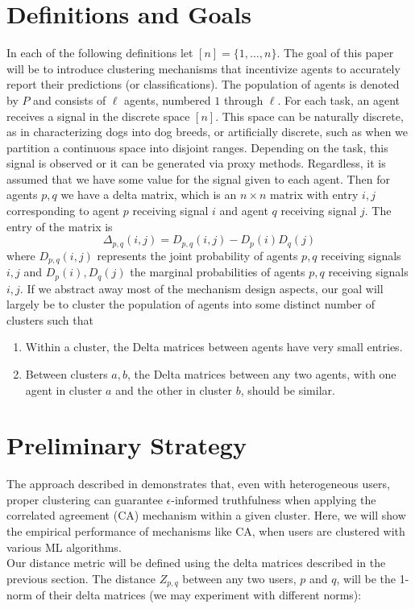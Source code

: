 \documentclass[a4paper, 12pt]{article}
\begin{document}
\section{Definitions and Goals}
In each of the following definitions let $[n] = \{1, \dots, n\}$. The goal of this paper will be to introduce clustering mechanisms that incentivize agents to accurately report their predictions (or classifications). The population of agents is denoted by $P$ and consists of $\ell$ agents, numbered $1$ through $\ell$. For each task, an agent receives a signal in the discrete space $[n]$. This space can be naturally discrete, as in characterizing dogs into dog breeds, or artificially discrete, such as when we partition a continuous space into disjoint ranges. Depending on the task, this signal is observed or it can be generated via proxy methods. Regardless, it is assumed that we have some value for the signal given to each agent. Then for agents $p,q$ we have a delta matrix, which is an $n \times n$ matrix with entry $i,j$ corresponding to agent $p$ receiving signal $i$ and agent $q$ receiving signal $j$. The entry of the matrix is $$\Delta_{p,q}(i,j) = D_{p,q}(i,j) - D_{p}(i)D_{q}(j)$$ where $D_{p,q}(i,j)$ represents the joint probability of agents $p,q$ receiving signals $i,j$ and $D_{p}(i),D_{q}(j)$ the marginal probabilities of agents $p,q$ receiving signals $i,j$. If we abstract away most of the mechanism design aspects, our goal will largely be to cluster the population of agents into some distinct number of clusters such that \begin{enumerate}
\item Within a cluster, the Delta matrices between agents have very small entries.
\item Between clusters $a,b$, the Delta matrices between any two agents, with one agent in cluster $a$ and the other in cluster $b$, should be similar.
\end{enumerate}

% 

\section{Preliminary Strategy}
The approach described in \citet{agarwal2017peer} demonstrates that, even with heterogeneous users, proper clustering can guarantee $\epsilon$-informed truthfulness when applying the correlated agreement (CA) mechanism within a given cluster. Here, we will show the empirical performance of mechanisms like CA, when users are clustered with various ML algorithms. \\
Our distance metric will be defined using the delta matrices described in the previous section. The distance $Z_{p,q}$ between any two users, $p$ and $q$, will be the 1-norm of their delta matrices (we may experiment with different norms):
\end{document}

